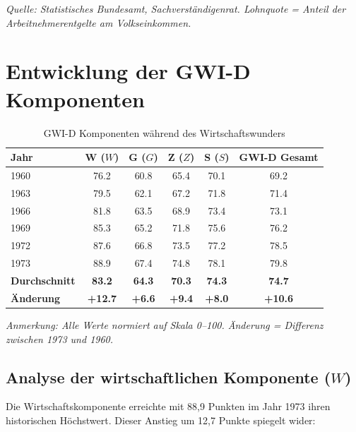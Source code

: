 \begin{flushleft}
\footnotesize{\textit{Quelle: Statistisches Bundesamt, Sachverständigenrat. Lohnquote = Anteil der Arbeitnehmerentgelte am Volkseinkommen.}}
\end{flushleft}

\section{Entwicklung der GWI-D Komponenten}

\begin{table}[ht]
    \centering
    \caption{GWI-D Komponenten während des Wirtschaftswunders}
    \label{tab:gwi_wirtschaftswunder}
    \begin{tabular}{lccccc}
        \toprule
        \textbf{Jahr} & \textbf{W (\(W\))} & \textbf{G (\(G\))} & \textbf{Z (\(Z\))} & \textbf{S (\(S\))} & \textbf{GWI-D Gesamt} \\
        \midrule
        1960 & 76.2 & 60.8 & 65.4 & 70.1 & 69.2 \\
        1963 & 79.5 & 62.1 & 67.2 & 71.8 & 71.4 \\
        1966 & 81.8 & 63.5 & 68.9 & 73.4 & 73.1 \\
        1969 & 85.3 & 65.2 & 71.8 & 75.6 & 76.2 \\
        1972 & 87.6 & 66.8 & 73.5 & 77.2 & 78.5 \\
        1973 & 88.9 & 67.4 & 74.8 & 78.1 & 79.8 \\
        \midrule
        \textbf{Durchschnitt} & \textbf{83.2} & \textbf{64.3} & \textbf{70.3} & \textbf{74.3} & \textbf{74.7} \\
        \textbf{Änderung} & \textbf{+12.7} & \textbf{+6.6} & \textbf{+9.4} & \textbf{+8.0} & \textbf{+10.6} \\
        \bottomrule
    \end{tabular}
\end{table}

\begin{flushleft}
\footnotesize{\textit{Anmerkung: Alle Werte normiert auf Skala 0–100. Änderung = Differenz zwischen 1973 und 1960.}}
\end{flushleft}

\subsection{Analyse der wirtschaftlichen Komponente (\(W\))}

Die Wirtschaftskomponente erreichte mit 88,9 Punkten im Jahr 1973 ihren historischen Höchstwert. Dieser Anstieg um 12,7 Punkte spiegelt wider:

